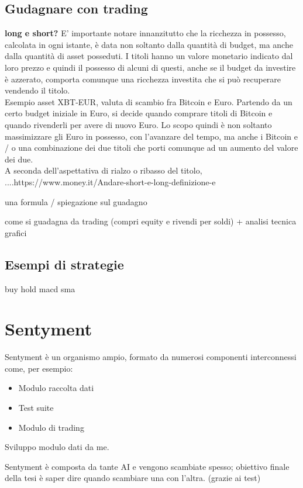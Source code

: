 \documentclass{article}
\begin{document}
	\subsection{Gudagnare con trading}
		\textbf{long e short?}
		E' importante notare innanzitutto che la ricchezza in possesso, calcolata in ogni istante, è data non soltanto dalla quantità di budget, ma anche dalla quantità di asset posseduti. I titoli hanno un valore monetario indicato dal loro prezzo e quindi il possesso di alcuni di questi, anche se il budget da investire è azzerato, comporta comunque una ricchezza investita che si può recuperare vendendo il titolo.\\
		Esempio asset XBT-EUR, valuta di scambio fra Bitcoin e Euro. Partendo da un certo budget iniziale in Euro, si decide quando comprare titoli di Bitcoin e quando rivenderli per avere di nuovo Euro. Lo scopo quindi è non soltanto massimizzare gli Euro in possesso, con l'avanzare del tempo, ma anche i Bitcoin e / o una combinazione dei due titoli che porti comunque ad un aumento del valore dei due.\\
		A seconda dell'aspettativa di rialzo o ribasso del titolo, ....https://www.money.it/Andare-short-e-long-definizione-e
		
		
		una formula / spiegazione sul guadagno
		
		come si guadagna da trading (compri equity e rivendi per soldi) + analisi tecnica grafici
		
		
	\subsection{Esempi di strategie}
		buy hold macd sma
		
		
	\section{Sentyment}
		Sentyment è un organismo ampio, formato da numerosi componenti interconnessi come, per esempio:
		\begin{itemize}
			\item Modulo raccolta dati
			\item Test suite
			\item Modulo di trading
		\end{itemize}
	
	
		Sviluppo modulo dati da me.
		
		Sentyment è composta da tante AI e vengono scambiate spesso; obiettivo finale della tesi è saper dire quando scambiare una con l'altra. (grazie ai test)
	    
\end{document}
